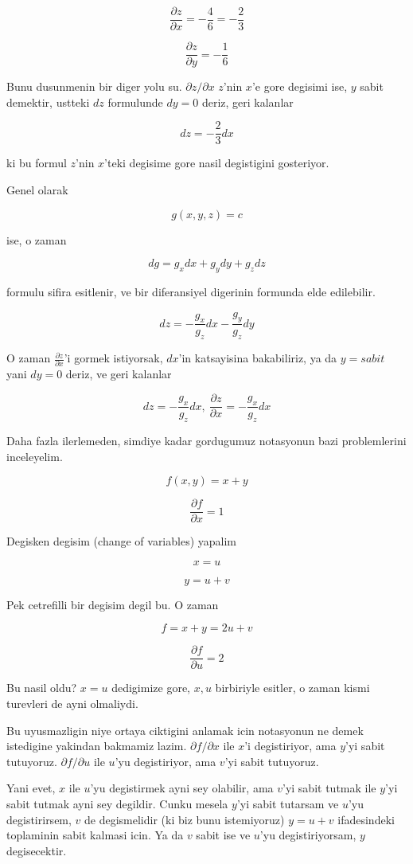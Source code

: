 \documentclass[12pt,fleqn]{article}
\begin{document}
\[ \frac{\partial z}{\partial x} = -\frac{4}{6} = -\frac{2}{3} \]

\[ \frac{\partial z}{\partial y} = -\frac{1}{6} \]

Bunu dusunmenin bir diger yolu su. $\partial z/\partial x$ $z$'nin $x$'e
gore degisimi ise, $y$ sabit demektir, ustteki $dz$ formulunde $dy=0$
deriz, geri kalanlar

\[ dz = -\frac{2}{3}dx \]

ki bu formul $z$'nin $x$'teki degisime gore nasil degistigini gosteriyor. 

Genel olarak 

\[ g(x,y,z) = c \]

ise, o zaman 

\[ dg = g_x dx + g_y dy + g_z dz \]

formulu sifira esitlenir, ve bir diferansiyel digerinin formunda elde
edilebilir. 

\[ dz = -\frac{g_x}{g_z}dx -\frac{g_y}{g_z}dy \]

O zaman $\frac{\partial z}{\partial x}$'i gormek istiyorsak, $dx$'in katsayisina bakabiliriz, ya 
da $y=sabit$ yani $dy=0$ deriz, ve geri kalanlar

\[ dz =  -\frac{g_x}{g_z}dx, \ 
\frac{\partial z}{\partial x} = -\frac{g_x}{g_z}dx
\]

Daha fazla ilerlemeden, simdiye kadar gordugumuz notasyonun bazi
problemlerini inceleyelim. 

\[ f(x,y) = x+y \]

\[ \frac{\partial f}{\partial x} = 1\]

Degisken degisim (change of variables) yapalim

\[ x = u \]

\[ y = u+v \]

Pek cetrefilli bir degisim degil bu. O zaman 

\[ f = x + y = 2u + v \]

\[ \frac{\partial f}{\partial u} = 2\]

Bu nasil oldu? $x=u$ dedigimize gore, $x,u$ birbiriyle esitler, o zaman
kismi turevleri de ayni olmaliydi. 

Bu uyusmazligin niye ortaya ciktigini anlamak icin notasyonun ne demek
istedigine yakindan bakmamiz lazim. $\partial f/\partial x$ ile $x$'i degistiriyor, 
ama $y$'yi sabit tutuyoruz. $\partial f/\partial u$ ile $u$'yu degistiriyor, ama $v$'yi 
sabit tutuyoruz.

Yani evet, $x$ ile $u$'yu degistirmek ayni sey olabilir, ama $v$'yi sabit
tutmak ile $y$'yi sabit tutmak ayni sey degildir. Cunku mesela $y$'yi sabit
tutarsam ve $u$'yu degistirirsem, $v$ de degismelidir (ki biz bunu
istemiyoruz) $y = u+v$ ifadesindeki toplaminin sabit kalmasi icin. Ya da $v$ 
sabit ise ve $u$'yu degistiriyorsam, $y$ degisecektir. 
\end{document}
